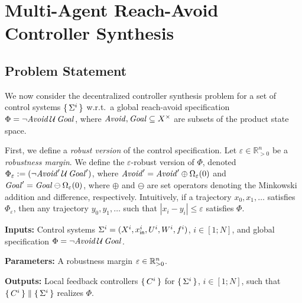 
\section{Multi-Agent Reach-Avoid Controller Synthesis}
\label{sec:problem}

\subsection{Problem Statement}

We now consider the decentralized controller synthesis problem for a set of control systems 
$\set{\Sigma^i}$ w.r.t.\ a global reach-avoid specification $\Phi = \lnot\mathit{Avoid}\, \mathcal{U}\,\mathit{Goal}$,
where $\mathit{Avoid}, \mathit{Goal} \subseteq X^\times$ are subsets of the product state space.

% 

First, we define a \emph{robust version} of the control specification.
Let $\varepsilon\in \mathbb{R}^n_{>0}$ be a \emph{robustness margin}. 
We define the $\varepsilon$-robust version of $\Phi$, denoted $\Phi_\varepsilon:=(\lnot\mathit{Avoid}'\,\mathcal{U}\,\mathit{Goal}')$,
where $\mathit{Avoid}'=\mathit{Avoid}'\oplus\Omega_\varepsilon(0)$ and 
$\mathit{Goal}'=\mathit{Goal}\ominus\Omega_\varepsilon(0)$, where $\oplus$ and $\ominus$ are set operators denoting the Minkowski addition and difference, respectively. 
Intuitively, if a trajectory $x_0,x_1,\ldots$ satisfies $\Phi_\varepsilon$, then any trajectory $y_0, y_1,\ldots$ such that
$|x_i - y_i | \leq \varepsilon$ satisfies $\Phi$.


\begin{resp}
\begin{problem}
\label{problem}
\noindent\textbf{Inputs:} Control systems $\Sigma^i=(X^i,x_{\mathsf{in}}^i,U^i,W^i,f^i)$, $i\in [1;N]$, and global specification $\Phi=\lnot\mathit{Avoid}\,\mathcal{U}\,\mathit{Goal}$.

\noindent\textbf{Parameters:} A robustness margin $\varepsilon\in \mathbb{R}^n_{>0}$.

\noindent\textbf{Outputs:} Local feedback controllers $\set{C^i}$ for $\set{\Sigma^i}$, $i\in [1;N]$, such that $\set{C^i}\parallel \set{\Sigma^i}$ realizes $\Phi$. 
\end{problem}
\end{resp}

